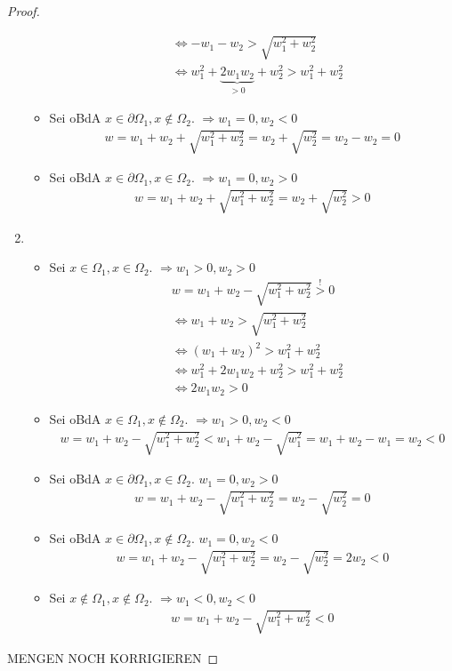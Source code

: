 \begin{proof}
\begin{enumerate}
\begin{itemize}
\begin{align*}
&\Leftrightarrow -w_1 - w_2 > \sqrt{w_1^2 + w_2^2}\\
&\Leftrightarrow w_1^2 + \underbrace{2w_1 w_2}_{>0} +w_2^2 > w_1^2 + w_2^2
\end{align*}
\item
Sei \ac{oBdA} $x \in \partial \Omega_1, x \notin \Omega_2$. $\Rightarrow w_1 = 0, w_2 < 0$
\begin{align*}
w =  w_1 + w_2 + \sqrt{w_1^2 + w_2^2} = w_2 + \sqrt{w_2^2} = w_2 - w_2 = 0
\end{align*}
\item
Sei \ac{oBdA} $x \in \partial \Omega_1, x \in \Omega_2$. $\Rightarrow w_1 = 0, w_2 > 0$
\begin{align*}
w = w_1 + w_2 + \sqrt{w_1^2 + w_2^2} = w_2 + \sqrt{w_2^2} > 0
\end{align*}
\end{itemize}
\item
\begin{itemize}
\item
Sei $x \in \Omega_1, x \in \Omega_2$. $\Rightarrow w_1 >0, w_2 >0$
\begin{align*}
&w = w_1 + w_2 - \sqrt{w_1^2 + w_2^2} \overset{!}{>}0\\
&\Leftrightarrow w_1 + w_2 > \sqrt{w_1^2 + w_2^2}\\
&\Leftrightarrow (w_1 + w_2)^2 > w_1^2 + w_2^2\\
&\Leftrightarrow w_1^2 + 2w_1 w_2 + w_2^2 > w_1^2 + w_2^2\\
&\Leftrightarrow 2w_1 w_2 >0
\end{align*}
\item
Sei \ac{oBdA} $x \in \Omega_1, x \notin \Omega_2$. $\Rightarrow w_1 >0, w_2 <0$
\begin{align*}
w = w_1 + w_2 - \sqrt{w_1^2 + w_2^2} < w_1 + w_2 - \sqrt{w_1^2} = w_1+w_2-w_1 = w_2 <0
\end{align*}
\item
Sei \ac{oBdA} $x \in \partial \Omega_1, x \in \Omega_2$. $w_1 = 0, w_2 > 0$
\begin{align*}
w = w_1 + w_2 - \sqrt{w_1^2+w_2^2} = w_2 - \sqrt{w_2^2} = 0
\end{align*}
\item
Sei \ac{oBdA} $x \in \partial \Omega_1, x \notin \Omega_2$. $w_1 = 0, w_2 < 0$
\begin{align*}
w = w_1 + w_2 - \sqrt{w_1^2 + w_2^2} = w_2 - \sqrt{w_2^2} = 2w_2 < 0
\end{align*}
\item
Sei $x \notin \Omega_1, x \notin \Omega_2$. $\Rightarrow w_1 < 0, w_2 < 0$
\begin{align*}
w = w_1 + w_2 - \sqrt{w_1^2 + w_2^2} < 0
\end{align*}
\end{itemize}
\end{enumerate}
MENGEN NOCH KORRIGIEREN
\end{proof}

